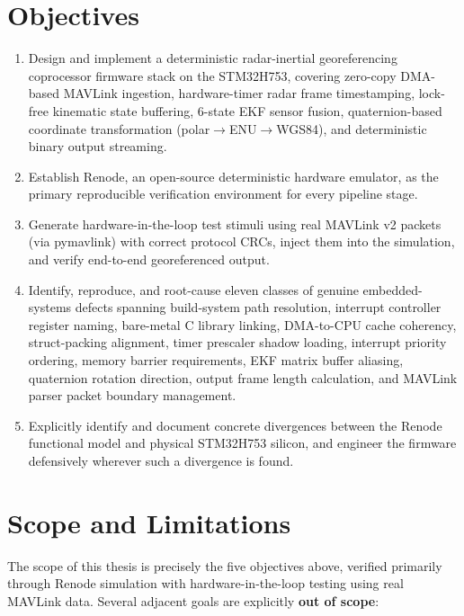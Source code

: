 \section{Objectives}

\begin{enumerate}
\item Design and implement a deterministic radar-inertial georeferencing coprocessor firmware stack on the STM32H753, covering zero-copy DMA-based MAVLink ingestion, hardware-timer radar frame timestamping, lock-free kinematic state buffering, 6-state EKF sensor fusion, quaternion-based coordinate transformation (polar$\rightarrow$ENU$\rightarrow$WGS84), and deterministic binary output streaming.
\item Establish Renode, an open-source deterministic hardware emulator, as the primary reproducible verification environment for every pipeline stage.
\item Generate hardware-in-the-loop test stimuli using real MAVLink v2 packets (via pymavlink) with correct protocol CRCs, inject them into the simulation, and verify end-to-end georeferenced output.
\item Identify, reproduce, and root-cause eleven classes of genuine embedded-systems defects spanning build-system path resolution, interrupt controller register naming, bare-metal C library linking, DMA-to-CPU cache coherency, struct-packing alignment, timer prescaler shadow loading, interrupt priority ordering, memory barrier requirements, EKF matrix buffer aliasing, quaternion rotation direction, output frame length calculation, and MAVLink parser packet boundary management.
\item Explicitly identify and document concrete divergences between the Renode functional model and physical STM32H753 silicon, and engineer the firmware defensively wherever such a divergence is found.
\end{enumerate}

\section{Scope and Limitations}

The scope of this thesis is precisely the five objectives above, verified primarily through Renode simulation with hardware-in-the-loop testing using real MAVLink data. Several adjacent goals are explicitly \textbf{out of scope}:


